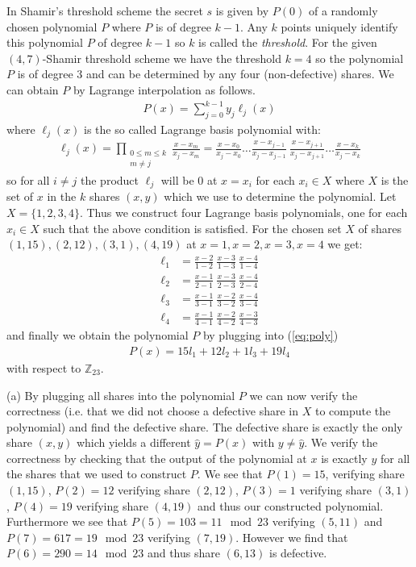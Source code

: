 \documentclass[11pt]{article}
\begin{document}
In Shamir's threshold scheme the secret $s$ is given by $P(0)$ of a randomly chosen polynomial $P$ where $P$ is of degree $k-1$. Any $k$ points uniquely identify this polynomial $P$ of degree $k-1$ so $k$ is called the \emph{threshold}. For the given $(4,7)$-Shamir threshold scheme we have the threshold $k = 4$ so the polynomial $P$ is of degree $3$ and can be determined by any four (non-defective) shares. We can obtain $P$ by Lagrange interpolation as follows.
\begin{align} \label{eq:poly}
    P(x) = \sum_{j=0}^{k-1} y_j \ell_j(x)
\end{align}
where $\ell_j(x)$ is the so called Lagrange basis polynomial with:
\begin{align*}
    \ell_j(x) = \prod_{\substack{0 \leq m \leq k \\ m \neq j}} \frac{x - x_m}{x_j - x_m} = \frac{x-x_0}{x_j-x_0} \ldots \frac{x-x_{j-1}}{x_j-x_{j-1}} \ \frac{x-x_{j+1}}{x_j-x_{j+1}} \ldots \frac{x-x_k}{x_j-x_k}
\end{align*}
so for all $i \neq j$ the product $\ell_j$ will be 0 at $x = x_i$ for each $x_i \in X$ where $X$ is the set of $x$ in the $k$ shares $(x,y)$ which we use to determine the polynomial. Let $X = \{ 1,2,3,4 \}$. Thus we construct four Lagrange basis polynomials, one for each $x_i \in X$ such that the above condition is satisfied. For the chosen set $X$ of shares $(1,15),(2,12),(3,1),(4,19)$ at $x=1,x=2,x=3,x=4$ we get:
\begin{align*}
    \ell_1 &= \frac{x-2}{1-2} \ \frac{x-3}{1-3} \ \frac{x-4}{1-4} \\[5pt]
    \ell_2 &= \frac{x-1}{2-1} \ \frac{x-3}{2-3} \ \frac{x-4}{2-4} \\[5pt]
    \ell_3 &= \frac{x-1}{3-1} \ \frac{x-2}{3-2} \ \frac{x-4}{3-4} \\[5pt]
    \ell_4 &= \frac{x-1}{4-1} \ \frac{x-2}{4-2} \ \frac{x-3}{4-3}
\end{align*}
and finally we obtain the polynomial $P$ by plugging into (\ref{eq:poly})
\begin{align}
    P(x) = 15 l_1 + 12 l_2 + 1 l_3 + 19 l_4
\end{align}
with respect to $\mathbb{Z}_{23}$.

\noindent (a) By plugging all shares into the polynomial $P$ we can now verify the correctness (i.e. that we did not choose a defective share in $X$ to compute the polynomial) and find the defective share. The defective share is exactly the only share $(x,y)$ which yields a different $\hat{y} = P(x)$ with $y \neq \hat{y}$. We verify the correctness by checking that the output of the polynomial at $x$ is exactly $y$ for all the shares that we used to construct $P$. We see that $P(1) = 15$, verifying share $(1,15)$, $P(2) = 12$ verifying share $(2,12)$, $P(3) = 1$ verifying share $(3,1)$, $P(4) = 19$ verifying share $(4,19)$ and thus our constructed polynomial. Furthermore we see that $P(5) = 103 = 11 \mod 23$ verifying $(5,11)$ and $P(7) = 617 = 19 \mod 23$ verifying $(7,19)$. However we find that $P(6) = 290 = 14 \mod 23$ and thus share $(6,13)$ is defective.
\end{document}
